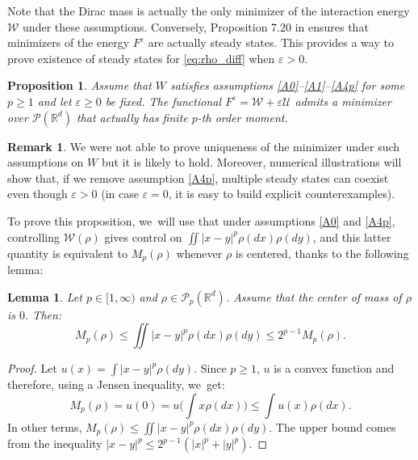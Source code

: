 \documentclass[JEP,XML,SOM,Unicode, NoFloatCountersInSection,published]{cedram}
\def\RR{\mathbb{R}}
\def\eps{\varepsilon}
\def\calP{{\mathcal P}}
\def\calU{{\mathcal U}}
\def\calW{{\mathcal W}}
\theoremstyle{plain}
\newtheorem{lemma}[theorem]{Lemma}
\newtheorem{prop}[theorem]{Proposition}
\theoremstyle{definition}
\newtheorem{remark}[theorem]{Remark}
\begin{document}
Note that the Dirac mass is actually the only minimizer of the interaction energy $\calW$ under these assumptions. Conversely, Proposition 7.20 in \cite{otam15} ensures that minimizers of the energy $F^\eps$ are actually steady states. This provides a way to prove existence of steady states for \eqref{eq:rho_diff} when $\eps >0$.

\Subsection{Existence of minimizers of $F^\eps$ for $\eps >0$}

\begin{prop}
Assume that $W$ satisfies assumptions \eqref{A0}--\eqref{A1}--\eqref{A4p} for some $p \geq 1$ and let $\eps \geq 0$ be fixed. The functional $F^\eps = \calW + \eps \calU$ admits a minimizer over $\calP(\RR^d)$ that actually has finite $p$-th order moment.
\end{prop}

\begin{remark}
We were not able to prove uniqueness of the minimizer under such assumptions on $W$ but it is likely to hold. Moreover, numerical illustrations will show that, if we remove assumption \eqref{A4p}, multiple steady states can coexist even though $\eps>0$ (in case $\eps=0$, it is easy to build explicit counterexamples).
\end{remark}
To prove this proposition, we~will use that under assumptions \eqref{A0} and \eqref{A4p}, controlling $\calW(\rho)$ gives control on $\iint |x-y|^p \rho(dx) \rho(dy)$, and this latter quantity is equivalent to $M_p(\rho)$ whenever $\rho$ is centered, thanks to the following lemma:
\begin{lemma}\label{lemma:equivalence_Wp}
Let $p \in [1, \infty)$ and $\rho \in \calP_p(\RR^d)$. Assume that the center of mass of $\rho$ is $0$. Then:
\[
M_p(\rho) \leq \iint |x-y|^p \rho(dx) \rho(dy) \leq 2^{p-1} M_p(\rho).
\]
\end{lemma}

\begin{proof}
Let $u(x) = \int |x-y|^p \rho(dy)$. Since $p \geq 1$, $u$ is a convex function and therefore, using a Jensen inequality, we~get:
\[
M_p(\rho)=u(0) = u \Big(\int x\rho(dx)\Big) \leq \int u(x) \rho(dx).
\]
In other terms, $M_p(\rho) \leq \iint |x-y|^p \rho(dx) \rho(dy)$. The upper bound comes from the inequality $|x-y|^p \leq 2^{p-1} (|x|^p + |y|^p)$.
\end{proof}
\end{document}
